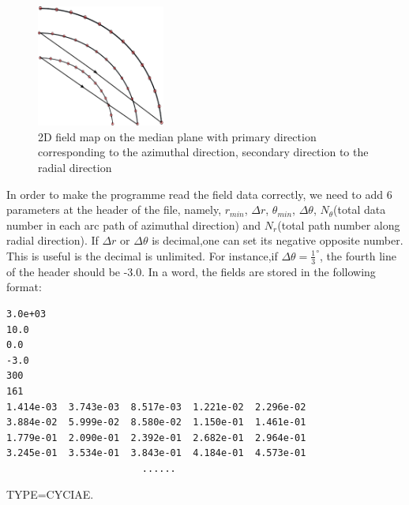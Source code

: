 \begin{figure}[ht]
  \begin{center}
    \includegraphics[origin=bl,height=40mm]{./figures/cyclotron/CarbonFieldFormat.pdf}
    \caption{2D field map on the median plane with primary direction corresponding to the azimuthal direction, secondary direction to the radial direction}
    \label{fig:CYCLField}
  \end{center}
\end{figure}
In order to make the programme read the field data correctly, we need to add 6 parameters at the header of the file, namely, 
$r_{min}$, $\Delta r$, $\theta_{min}$, $\Delta \theta$, 
$N_\theta$(total data number in each arc path of azimuthal direction) and $N_r$(total path number along radial direction). 
If $\Delta r$ or $\Delta \theta$ is decimal,one can set its negative opposite number. This is useful is the decimal is unlimited. 
For instance,if $\Delta \theta = \frac{1}{3}^\circ$, the fourth line of the header should be -3.0. 
In a word, the fields are stored in the following format:
\begin{verbatim}
3.0e+03
10.0
0.0
-3.0
300
161
1.414e-03  3.743e-03  8.517e-03  1.221e-02  2.296e-02 
3.884e-02  5.999e-02  8.580e-02  1.150e-01  1.461e-01 
1.779e-01  2.090e-01  2.392e-01  2.682e-01  2.964e-01 
3.245e-01  3.534e-01  3.843e-01  4.184e-01  4.573e-01 
                        ......
\end{verbatim}

\item TYPE=CYCIAE. 

